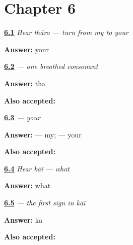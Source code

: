 \section*{Chapter 6}

\noindent\begin{minipage}[t]{\linewidth}
\raggedright
\hyperlink{review-MW-C05-hear-tharo-meaning}{\textbf{6.1}} \emph{Hear \emph{thāro} — turn from my to your}\par
\small \textbf{Answer:} your\par
\end{minipage}\par\medskip

\noindent\begin{minipage}[t]{\linewidth}
\raggedright
\hyperlink{review-MW-W05-tha-read}{\textbf{6.2}} \emph{ — one breathed consonant}\par
\small \textbf{Answer:} tha\par
\footnotesize \textbf{Also accepted:} 
\end{minipage}\par\medskip

\noindent\begin{minipage}[t]{\linewidth}
\raggedright
\hyperlink{review-MW-C05-tharo-contrast}{\textbf{6.3}} \emph{ — your}\par
\small \textbf{Answer:}  — my;  — your\par
\footnotesize \textbf{Also accepted:}  
\end{minipage}\par\medskip

\noindent\begin{minipage}[t]{\linewidth}
\raggedright
\hyperlink{review-MW-C05-hear-kain-meaning}{\textbf{6.4}} \emph{Hear \emph{kāĩ} — what}\par
\small \textbf{Answer:} what\par
\end{minipage}\par\medskip

\noindent\begin{minipage}[t]{\linewidth}
\raggedright
\hyperlink{review-MW-W05-ka-read}{\textbf{6.5}} \emph{ — the first sign in \emph{kāĩ}}\par
\small \textbf{Answer:} ka\par
\footnotesize \textbf{Also accepted:} 
\end{minipage}\par\medskip


